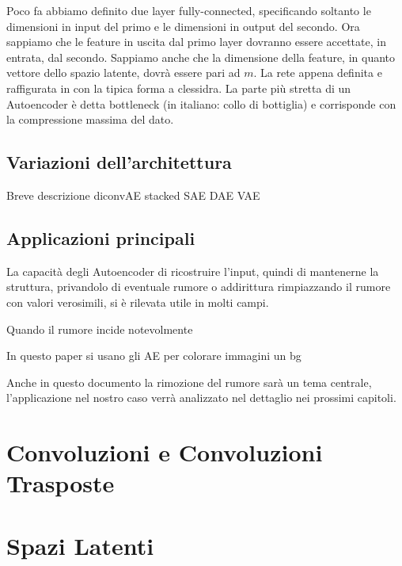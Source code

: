 Poco fa abbiamo definito due layer fully-connected, specificando soltanto le dimensioni in input del primo e le dimensioni in output del secondo.
Ora sappiamo che le feature in uscita dal primo layer dovranno essere accettate, in entrata, dal secondo.
Sappiamo anche che la dimensione della feature, in quanto vettore dello spazio latente, dovrà essere pari ad $m$.
La rete appena definita e raffigurata in %
con la tipica forma a clessidra.
La parte più stretta di un Autoencoder è detta bottleneck (in italiano: collo di bottiglia) e corrisponde con la compressione massima del dato.


\subsection{Variazioni dell'architettura}
Breve descrizione diconvAE stacked SAE DAE VAE


\subsection{Applicazioni principali}

La capacità degli Autoencoder di ricostruire l'input, quindi di mantenerne la struttura, privandolo di eventuale rumore o addirittura rimpiazzando il rumore con valori verosimili, si è rilevata utile in molti campi.

Quando il rumore incide notevolmente

In questo paper si usano gli AE per colorare immagini un bg

Anche in questo documento la rimozione del rumore sarà un tema centrale, l'applicazione nel nostro caso verrà analizzato nel dettaglio nei prossimi capitoli.









\section {Convoluzioni e Convoluzioni Trasposte}
\section {Spazi Latenti}

